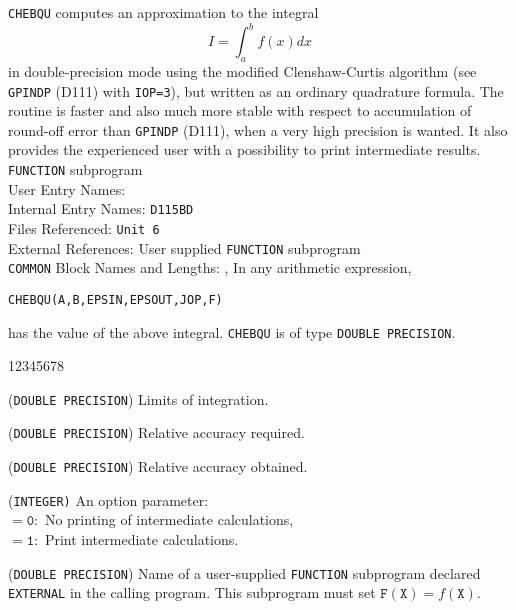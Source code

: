                                   
                                  
\Submitter{}                                       
                         
{\tt CHEBQU} computes an approximation to the integral
        $$ I=\int_a^b f(x)dx $$
in double-precision mode using the modified Clenshaw-Curtis algorithm
(see {\tt GPINDP} (D111) with {\tt IOP=3}),
but written as an ordinary quadrature
formula. The routine is faster and also much more stable with respect
to accumulation of round-off error than {\tt GPINDP} (D111),
when a very high precision is wanted. It also provides the experienced
user with a possibility to print intermediate results.
\Structure
{\tt FUNCTION} subprogram \\
User Entry Names:   \\
Internal Entry Names:  {\tt D115BD}\\
Files Referenced: {\tt Unit 6}\\
External  References: User supplied {\tt FUNCTION} subprogram \\
{\tt COMMON} Block Names and Lengths:
, 
\Usage
In any arithmetic expression,
\begin{center}
{\tt CHEBQU(A,B,EPSIN,EPSOUT,JOP,F)}
\end{center}
has the value of the above integral. {\tt CHEBQU} is of type
{\tt DOUBLE PRECISION}.
\begin{DLtt}{12345678}
\item [A,B] ({\tt DOUBLE PRECISION}) Limits of integration.
\item [EPSIN] ({\tt DOUBLE PRECISION}) Relative accuracy required.
\item [EPSOUT] ({\tt DOUBLE PRECISION}) Relative accuracy obtained.
\item [JOP] ({\tt INTEGER)} An option parameter: \\
$\mathtt{= 0:}$ No printing of intermediate calculations, \\
$\mathtt{= 1:}$ Print intermediate calculations.
\item[F] ({\tt DOUBLE PRECISION}) Name of a user-supplied {\tt FUNCTION}
subprogram declared {\tt EXTERNAL} in the calling program. This
subprogram must set $\mathtt{F(X)} = f(\mathtt{X})$.
\end{DLtt}
